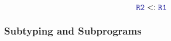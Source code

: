 \begin{equation*}
  \mathtt{\SemanticType{R2}} <: \mathtt{\SemanticType{R1}}
\end{equation*}

\subsubsection{Subtyping and Subprograms}\label{subsubsec:Subtyping_and_Subprograms}


